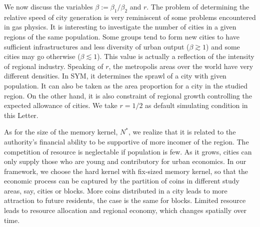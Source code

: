 \documentclass[reprint,unsortedaddress,amsmath,amssymb,floatfix,aps,prl,showkeys]{revtex4-2}
\begin{document}
We now discuss the variables $\beta:=\beta_1/\beta_2$ and $r$. The problem of determining the relative speed of city generation is very reminiscent of some problems encountered in gas physics. It is interesting to investigate the number of cities in a given regions of the same population. Some groups tend to form new cities to have sufficient infrastructures and less diversity of urban output ($\beta\gtrsim 1$) and some cities may go otherwise ($\beta\lesssim 1$). This value is actually a reflection of the intensity of regional industry. Speaking of $r$, the metropolis areas over the world have very different densities. In SYM, it determines the sprawl of a city with given population. It can also be taken as the area proportion for a city in the studied region. On the other hand, it is also constraint of regional growth controlling the expected allowance of cities. We take $r=1/2$ as default simulating condition in this Letter.

As for the size of the memory kernel, $N^*$, we realize that it is related to the authority's financial ability to be supportive of more incomer of the region. The competition of resource is neglectable if population is few. As it grows, cities can only supply those who are young and contributory for urban economics. In our framework, we choose the hard kernel with fix-sized memory kernel, so that the economic process can be captured by the partition of coins in different study areas, say, cities or blocks. More coins distributed in a city leads to more attraction to future residents, the case is the same for blocks. Limited resource leads to resource allocation and regional economy, which changes spatially over time. 
\end{document}
